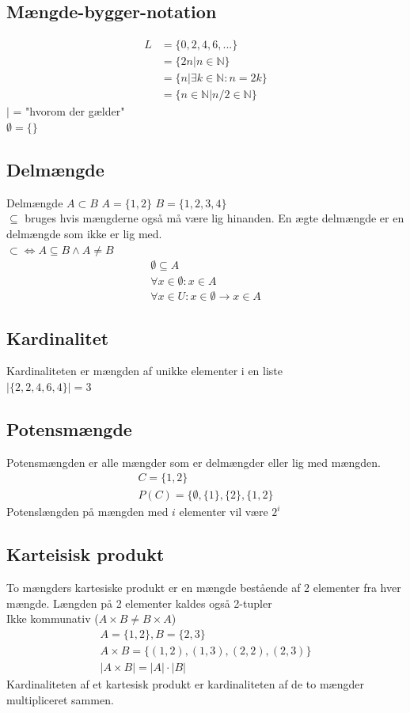 \documentclass[12pt, a4paper]{article}
\begin{document}
			\subsection{Mængde-bygger-notation}
				\begin{align*}
					L&=\{0,2,4,6,...\}\\
					 &=\{2n|n\in\mathbb{N}\}\\
					 &=\{n|\exists k \in \mathbb{N}:n=2k\}\\
					 &=\{n\in\mathbb{N}| n/2\in\mathbb{N}\}
				\end{align*}
				$|$ = "hvorom der gælder"\\
				$\emptyset = \{\}$\\
			\subsection{Delmængde}
				Delmængde $A\subset B$ $A=\{1,2\}$ $B=\{1,2,3,4\}$\\
				$\subseteq$ bruges hvis mængderne også må være lig hinanden. En ægte delmængde er en delmængde som ikke er lig med.\\
		  		$\subset \iff A\subseteq B \land A\neq B$
		  		\begin{align*}
			  		\emptyset \subseteq A\\
			  		\forall x \in \emptyset : x \in A\\
			  		\forall x \in U : x\in \emptyset \rightarrow x \in A
		  		\end{align*}
			\subsection{Kardinalitet}
				Kardinaliteten er mængden af unikke elementer i en liste\\
				$|\{2,2,4,6,4\}|=3$\\
			\subsection{Potensmængde}
				Potensmængden er alle mængder som er delmængder eller lig med mængden.\\
				\begin{align*}
					C=\{1,2\}\\
					P(C)=\{\emptyset,\{1\},\{2\},\{1,2\}
				\end{align*}
				Potenslængden på mængden med $i$ elementer vil være $2^i$
			\subsection{Karteisisk produkt}
				To mængders kartesiske produkt er en mængde bestående af 2 elementer fra hver mængde. Længden på 2 elementer kaldes også 2-tupler\\
				Ikke kommunativ ($A\times B \neq B\times A$)\\
				\begin{align*}
					A=\{1,2\}, B=\{2,3\}\\
					A\times B = \{(1,2),(1,3),(2,2),(2,3)\}\\
					|A\times B| = |A| \cdot |B|
				\end{align*}
				Kardinaliteten af et kartesisk produkt er kardinaliteten af de to mængder multipliceret sammen.\\
\end{document}
